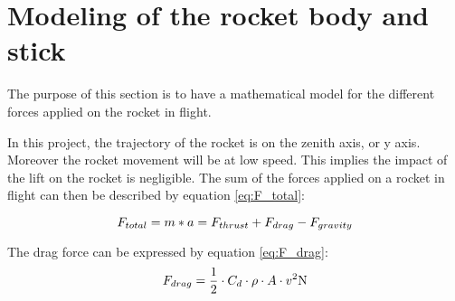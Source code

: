 %			
%			
		
		\section{Modeling of the rocket body and stick}
			
		The purpose of this section is to have a mathematical model for the different forces applied on the rocket in flight. 
		
		In this project, the trajectory of the rocket is on the zenith axis, or y axis. Moreover the rocket movement will be at low speed. This implies the impact of the lift on the rocket is negligible. The sum of the forces applied on a rocket in flight can then be described by equation \vref{eq:F_total}:
		
		\begin{equation}
		F_{total} = m*a = F_{thrust} + F_{drag} - F_{gravity} \addunit{\newton} \label{eq:F_{total}}
		\end{equation}
		\startexplain
		\stopexplain
		
		The drag force can be expressed by equation \vref{eq:F_drag}:
		\begin{equation}
		F_{drag} = \frac{1}{2} \cdot C_{d} \cdot \rho \cdot A \cdot v^2 \si{\newton} \label{eq:F_{drag}}
		\end{equation}
		\startexplain
		\stopexplain
			
